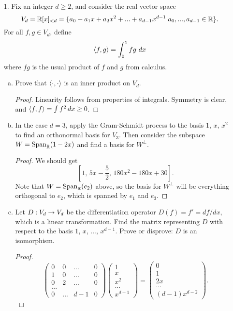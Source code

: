 
\begin{itemize}

\item[1.] Fix an integer $d \geq 2$, and consider the real vector space
$$V_d = \mathbb{R}[x]_{<d} = \{a_0 + a_1 x + a_2 x^2 + ... + a_{d-1} x^{d-1} | a_0, ... , a_{d-1} \in \mathbb{R}\}.$$
For all $f, g \in V_d$, define
$$\ip{f}{g} = \int_0^1 fg \ dx$$
where $f g$ is the usual product of $f$ and $g$ from calculus.
\begin{enumerate}[(a)]
    \item Prove that $\langle{}\cdot,\cdot\rangle$ is an inner product on $V_d$.
    \begin{proof}
    Linearity follows from properties of integrals. Symmetry is clear, and $\langle{}f,f\rangle = \int f^2 \, dx \geq 0$.
    \end{proof}
    
    \item In the case $d = 3$, apply the Gram-Schmidt process to the basis $1$, $x$, $x^2$ to find an orthonormal basis for $V_3$. Then consider the subspace $W = \text{Span}_{\mathbb{R}}(1 - 2x)$ and find a basis for $W^{\perp}$.
    \begin{proof}
    We should get \[\left[1, \, 5x - \frac{5}{2}, \, 180x^2 - 180x + 30\right].\]
    Note that $W = \text{Span}_{\mathbb{R}}(e_2)$ above, so the basis for $W^{\perp}$ will be everything orthogonal to $e_2$, which is spanned by $e_1$ and $e_3$.
    \end{proof}
    
    \item Let $D : V_d \rightarrow V_d$ be the differentiation operator $D(f) = f' = df / dx$, which is a linear transformation. Find the matrix representing $D$ with respect to the basis $1$, $x$, ..., $x^{d-1}$. Prove or disprove: $D$ is an isomorphism.
    \begin{proof}
    \[\begin{pmatrix}
    0 & 0 & ... & 0 \\
    1 & 0 & ... & 0 \\
    0 & 2 & ... & 0 \\
    ... & & & \\
    0 & ... & d-1 & 0
    \end{pmatrix} 
    \begin{pmatrix}
    1 \\
    x \\
    x^2 \\
    ... \\
    x^{d-1}
    \end{pmatrix}
    = 
    \begin{pmatrix}
    0 \\
    1 \\
    2x \\
    ... \\
    (d-1)x^{d-2}
    \end{pmatrix}.\]


\end{proof}
\end{enumerate}
\end{itemize}
